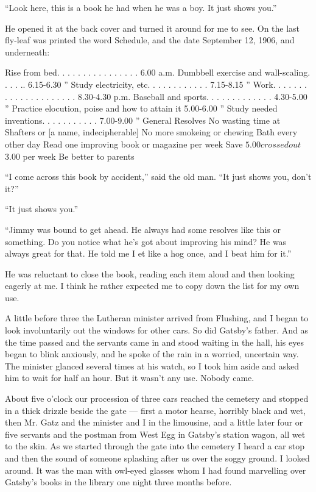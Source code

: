 \documentclass{znotebook}
\begin{document}
``Look here, this is a book he had when he was a boy. It just shows you.''

He opened it at the back cover and turned it around for me to see. On the last fly-leaf was printed the word Schedule, and the date September 12, 1906, and underneath:

Rise from bed. . . . . . . . . . . . . . . .	6.00 a.m.
Dumbbell exercise and wall-scaling. . . . ..	6.15-6.30 ''
Study electricity, etc. . . . . . . . . . . .	7.15-8.15 ''
Work. . . . . . . . . . . . . . . . . . . . .	8.30-4.30 p.m.
Baseball and sports. . . . . . . . . . . . .	4.30-5.00 ''
Practice elocution, poise and how to attain it	5.00-6.00 ''
Study needed inventions. . . . . . . . . . .	7.00-9.00 ''
General Resolves No wasting time at Shafters or [a name, indecipherable] No more smokeing or chewing Bath every other day Read one improving book or magazine per week Save $5.00 {crossed out} $3.00 per week Be better to parents

``I come across this book by accident,'' said the old man. ``It just shows you, don’t it?''

``It just shows you.''

``Jimmy was bound to get ahead. He always had some resolves like this or something. Do you notice what he’s got about improving his mind? He was always great for that. He told me I et like a hog once, and I beat him for it.''

He was reluctant to close the book, reading each item aloud and then looking eagerly at me. I think he rather expected me to copy down the list for my own use.

A little before three the Lutheran minister arrived from Flushing, and I began to look involuntarily out the windows for other cars. So did Gatsby’s father. And as the time passed and the servants came in and stood waiting in the hall, his eyes began to blink anxiously, and he spoke of the rain in a worried, uncertain way. The minister glanced several times at his watch, so I took him aside and asked him to wait for half an hour. But it wasn’t any use. Nobody came.

About five o’clock our procession of three cars reached the cemetery and stopped in a thick drizzle beside the gate — first a motor hearse, horribly black and wet, then Mr. Gatz and the minister and I in the limousine, and a little later four or five servants and the postman from West Egg in Gatsby’s station wagon, all wet to the skin. As we started through the gate into the cemetery I heard a car stop and then the sound of someone splashing after us over the soggy ground. I looked around. It was the man with owl-eyed glasses whom I had found marvelling over Gatsby’s books in the library one night three months before.
\end{document}
